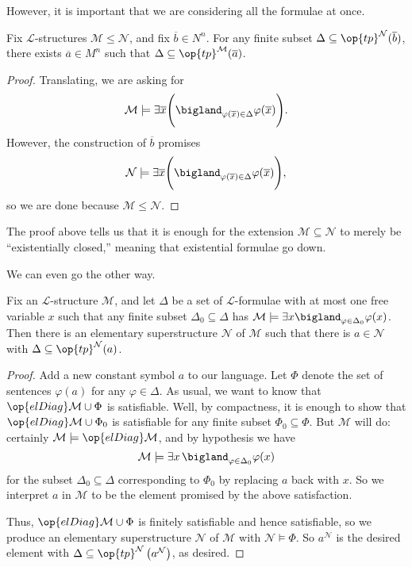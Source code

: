 \documentclass[../notes.tex]{subfiles}
\begin{document}
However, it is important that we are considering all the formulae at once.
\begin{proposition}
	Fix $\mathcal L$-structures $\mathcal M\le\mathcal N$, and fix $\overline b\in N^n$. For any finite subset $\Delta\subseteq\op{tp}^{\mathcal N}(\overline b)$, there exists $\overline a\in M^n$ such that $\Delta\subseteq\op{tp}^{\mathcal M}(\overline a)$.
\end{proposition}
\begin{proof}
	Translating, we are asking for
	\[\mathcal M\models\exists\overline x\Bigg(\bigland_{\varphi(\overline x)\in\Delta}\varphi(\overline x)\Bigg).\]
	However, the construction of $\overline b$ promises
	\[\mathcal N\models\exists\overline x\Bigg(\bigland_{\varphi(\overline x)\in\Delta}\varphi(\overline x)\Bigg),\]
	so we are done because $\mathcal M\le\mathcal N$.
\end{proof}
\begin{remark}
	The proof above tells us that it is enough for the extension $\mathcal M\subseteq\mathcal N$ to merely be ``existentially closed,'' meaning that existential formulae go down.
\end{remark}
We can even go the other way.
\begin{proposition} \label{prop:realize-type-no-param}
	Fix an $\mathcal L$-structure $\mathcal M$, and let $\Delta$ be a set of $\mathcal L$-formulae with at most one free variable $x$ such that any finite subset $\Delta_0\subseteq\Delta$ has $\mathcal M\models\exists x\bigland_{\varphi\in\Delta_0}\varphi(x)$. Then there is an elementary superstructure $\mathcal N$ of $\mathcal M$ such that there is $a\in\mathcal N$ with $\Delta\subseteq\op{tp}^{\mathcal N}(a)$.
\end{proposition}
\begin{proof}
	Add a new constant symbol $a$ to our language. Let $\Phi$ denote the set of sentences $\varphi(a)$ for any $\varphi\in\Delta$. As usual, we want to know that $\op{elDiag}\mathcal M\cup\Phi$ is satisfiable. Well, by compactness, it is enough to show that $\op{elDiag}\mathcal M\cup\Phi_0$ is satisfiable for any finite subset $\Phi_0\subseteq\Phi$. But $\mathcal M$ will do: certainly $\mathcal M\models\op{elDiag}\mathcal M$, and by hypothesis we have
	\[\mathcal M\models\exists x\,\bigland_{\varphi\in\Delta_0}\varphi(x)\]
	for the subset $\Delta_0\subseteq\Delta$ corresponding to $\Phi_0$ by replacing $a$ back with $x$. So we interpret $a$ in $\mathcal M$ to be the element promised by the above satisfaction.

	Thus, $\op{elDiag}\mathcal M\cup\Phi$ is finitely satisfiable and hence satisfiable, so we produce an elementary superstructure $\mathcal N$ of $\mathcal M$ with $\mathcal N\models\Phi$. So $a^{\mathcal N}$ is the desired element with $\Delta\subseteq\op{tp}^{\mathcal N}\left(a^{\mathcal N}\right)$, as desired.
\end{proof}
\end{document}
